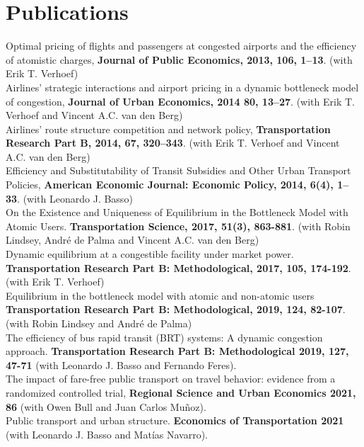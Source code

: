 \documentclass[10pt,a4paper]{article}
\newif\ifES
\newcommand{\tr}[2]{\ifES#2\else#1\fi}
\newcommand{\cvwith}{\tr{with}{con}}
\newcommand{\cvand}{\tr{and}{y}}
\begin{document}
\section*{\tr{Publications}{Publicaciones}}
Optimal pricing of flights and passengers at congested airports and the efficiency of atomistic charges, \textbf{Journal of Public Economics, 2013, 106, 1--13}.  (\cvwith{} Erik T. Verhoef)\\[6pt]
Airlines' strategic interactions and airport pricing in a dynamic bottleneck model of congestion, \textbf{Journal of Urban Economics, 2014 80, 13--27}. (\cvwith{} Erik T. Verhoef \cvand{} Vincent A.C. van den Berg) \\[6pt]
Airlines' route structure competition and network policy, \textbf{Transportation Research Part B, 2014, 67, 320--343}. (\cvwith{} Erik T. Verhoef \cvand{} Vincent A.C. van den Berg)\\[6pt]
Efficiency and Substitutability of Transit Subsidies and Other Urban Transport Policies, \textbf{American Economic Journal: Economic Policy, 2014, 6(4), 1--33}. (\cvwith{} Leonardo J. Basso)\\[6pt]
On the Existence and Uniqueness of Equilibrium in the Bottleneck Model with Atomic Users. \textbf{Transportation Science, 2017, 51(3), 863-881}. (\cvwith{} Robin Lindsey, Andr\'{e} de Palma \cvand{} Vincent A.C. van den Berg) \\[6pt]
Dynamic equilibrium at a congestible facility under market power. \textbf{Transportation Research Part B: Methodological, 2017, 105, 174-192}. (\cvwith{} Erik T. Verhoef) \\[6pt]
Equilibrium in the bottleneck model with atomic and non-atomic users \textbf{Transportation Research Part B: Methodological, 2019, 124, 82-107}. (\cvwith{} Robin Lindsey \cvand{} Andr\'{e} de Palma) \\[6pt]
The efficiency of bus rapid transit (BRT) systems: A dynamic congestion approach. \textbf{Transportation Research Part B: Methodological 2019, 127, 47-71} (\cvwith{} Leonardo J. Basso \cvand{} Fernando Feres).\\[6pt]
The impact of fare-free public transport on travel behavior: evidence from a randomized controlled trial, \textbf{Regional Science and Urban Economics 2021, 86} (\cvwith{} Owen Bull \cvand{} Juan Carlos Muñoz). \\[6pt]
Public transport and urban structure. \textbf{Economics of Transportation 2021} (\cvwith{} Leonardo J. Basso \cvand{} Mat\'{i}as Navarro). \\[6pt]
\end{document}
